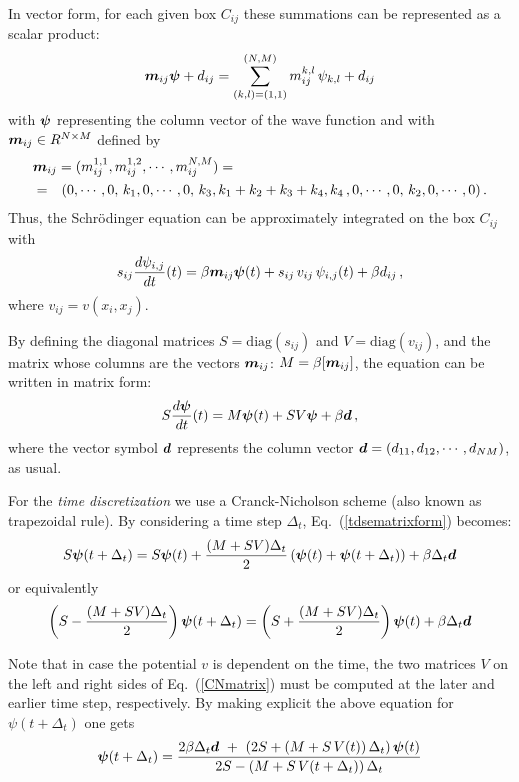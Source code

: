 \documentclass[a4paper,11pt]{article}
\newcommand{\ve}[1]{\mbox{\boldmath $ #1$}}
\begin{document}
In vector form, for each given box $C_{ij}$ these summations can be represented as a scalar product:
\begin{equation}
\ve m_{ij} \ve \psi + d_{ij} = \sum_{(k,l)=(1,1)}^{(N,M)} m_{ij}^{k,l} \, \psi_{k,l} + d_{ij}
\end{equation}
with $\ve \psi$ representing the column vector of the wave function and
with $\ve m_{ij} \in R^{N \times M}$ defined by
\begin{eqnarray}
\lefteqn{ \ve m_{ij} = (m_{ij}^{1,1}, m_{ij}^{1,2},\cdots, m_{ij}^{N,M}) = }  \\ \nonumber
&=&(0,\cdots, 0, \, k_1, 0, \cdots, 0, \, k_3, k_1+k_2+k_3+k_4, k_4 \, , 0,\cdots, 0, \, k_2, 0, \cdots, 0) \, .
\end{eqnarray}
Thus, the Schr\"{o}dinger equation can be approximately integrated on the box $C_{ij}$ with
\begin{equation}
s_{ij} \frac{d \psi_{i,j}}{dt}(t) = 
\beta \ve m_{ij} \ve \psi(t) + s_{ij} \, v_{ij} \, \psi_{i,j}(t) + \beta d_{ij} \, ,
\end{equation}
where $v_{ij}=v(x_i,x_j)$. 

By defining the diagonal matrices $S = \mbox{diag}(s_{ij})$ and $V = \mbox{diag}(v_{ij})$,
and the matrix whose columns are the vectors $\ve m_{ij}$: $M = \beta [\ve m_{ij}]$,
the equation can be written in matrix form:
\begin{equation} \label{tdsematrixform}
S \frac{d \ve \psi}{dt}(t) = M \ve \psi(t) + S V \ve \psi + \beta \ve d \, ,
\end{equation}
where the vector symbol $\ve d$ represents the column vector
$\ve d = (d_{11}, d_{12},\cdots, d_{NM})$, as usual.

For the \emph{time discretization} we use a Cranck-Nicholson scheme (also known as
trapezoidal rule).  By considering a time step $\Delta_t$, Eq.~(\ref{tdsematrixform}) becomes:
\begin{equation}
S {\ve \psi}(t+\Delta_t) = S \ve \psi(t) + \frac{(M+SV)\Delta_t}{2} 
\left( \ve \psi(t) + \ve \psi(t+\Delta_t) \right) + \beta \Delta_t \ve d
\end{equation}
or equivalently
\begin{equation} \label{CNmatrix}
\left( S - \frac{(M+SV)\Delta_t}{2} \right) \ve \psi(t+\Delta_t) =
\left( S + \frac{(M+SV)\Delta_t}{2} \right) \ve \psi(t) + \beta \Delta_t \ve d
\end{equation}

Note that in case the potential $v$ is dependent on the time, the two matrices $V$ on
the left and right sides of Eq.~(\ref{CNmatrix}) must be computed at the later and earlier
time step, respectively.
By making explicit the above equation for $\psi(t+\Delta_t)$ one gets
\begin{equation}
\ve \psi(t+\Delta_t) =
\frac{ 2\beta \Delta_t \ve d \ + \ \left(2S + \left( M+S\,V(t) \right)\Delta_t\right) \ve \psi(t) }
{2S - \left( M+S\,V(t+\Delta_t)\right)\Delta_t}
\end{equation}
\end{document}

